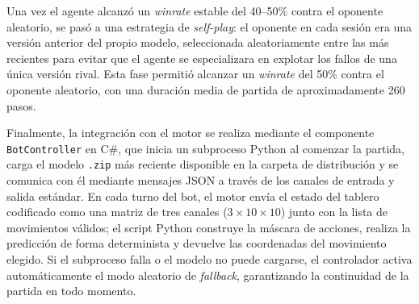 Una vez el agente alcanzó un \textit{winrate} estable del 40--50\% contra el oponente aleatorio, se pasó a una estrategia de \textit{self-play}: el oponente en cada sesión era una versión anterior del propio modelo, seleccionada aleatoriamente entre las más recientes para evitar que el agente se especializara en explotar los fallos de una única versión rival. Esta fase permitió alcanzar un \textit{winrate} del 50\% contra el oponente aleatorio, con una duración media de partida de aproximadamente 260 pasos.

Finalmente, la integración con el motor se realiza mediante el componente \texttt{BotController} en C\#, que inicia un subproceso Python al comenzar la partida, carga el modelo \texttt{.zip} más reciente disponible en la carpeta de distribución y se comunica con él mediante mensajes JSON a través de los canales de entrada y salida estándar. En cada turno del bot, el motor envía el estado del tablero codificado como una matriz de tres canales ($3 \times 10 \times 10$) junto con la lista de movimientos válidos; el script Python construye la máscara de acciones, realiza la predicción de forma determinista y devuelve las coordenadas del movimiento elegido. Si el subproceso falla o el modelo no puede cargarse, el controlador activa automáticamente el modo aleatorio de \textit{fallback}, garantizando la continuidad de la partida en todo momento.
